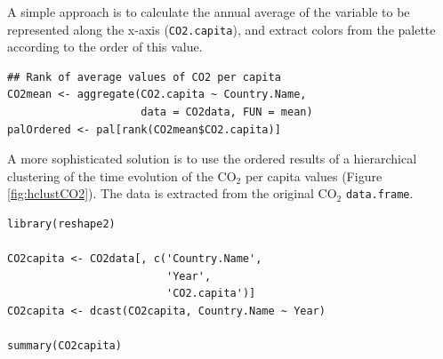 A simple approach is to calculate the annual average of the
variable to be represented along the x-axis (\texttt{CO2.capita}), and
extract colors from the palette according to the order of this
value.  


\lstset{language=r,label= ,caption= ,captionpos=b,numbers=none}
\begin{lstlisting}
## Rank of average values of CO2 per capita
CO2mean <- aggregate(CO2.capita ~ Country.Name,
                     data = CO2data, FUN = mean)
palOrdered <- pal[rank(CO2mean$CO2.capita)]  
\end{lstlisting}

A more sophisticated solution is to use the ordered results of a
hierarchical clustering of the time evolution of the \(\mathrm{CO_2}\) per capita
values (Figure \ref{fig:hclustCO2}). The data is extracted from the
original \(\mathrm{CO_2}\) \texttt{data.frame}.  

\lstset{language=r,label= ,caption= ,captionpos=b,numbers=none}
\begin{lstlisting}
library(reshape2)

CO2capita <- CO2data[, c('Country.Name',
                         'Year',
                         'CO2.capita')]
CO2capita <- dcast(CO2capita, Country.Name ~ Year)

summary(CO2capita)
\end{lstlisting}

